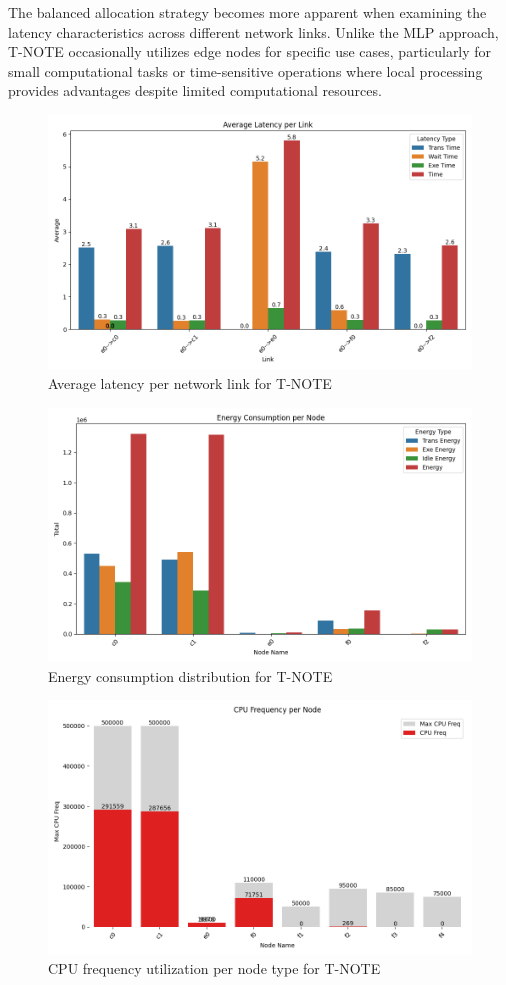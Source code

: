 \documentclass[preprint,3p,authoryear]{elsarticle}
\begin{document}
The balanced allocation strategy becomes more apparent when examining the latency characteristics across different network links. Unlike the MLP approach, T-NOTE occasionally utilizes edge nodes for specific use cases, particularly for small computational tasks or time-sensitive operations where local processing provides advantages despite limited computational resources.

\begin{figure}[H]
    \centering
    \includegraphics[width=0.5\linewidth]{figs/T-NOTE/avg_latency_per_link.png}
    \caption{Average latency per network link for T-NOTE}
    \label{fig:T-NOTE-avg-latency}
\end{figure}

\begin{figure}[H]
    \centering
    \includegraphics[width=0.5\linewidth]{figs/T-NOTE/energy_consumption_per_node.png}
    \caption{Energy consumption distribution for T-NOTE}
    \label{fig:T-NOTE-energy-consumption}
\end{figure}

\begin{figure}[H]
    \centering
    \includegraphics[width=0.5\linewidth]{figs/T-NOTE/cpu_frequency_per_node.png}
    \caption{CPU frequency utilization per node type for T-NOTE}
    \label{fig:T-NOTE-cpu-frequency}
\end{figure}
\end{document}
